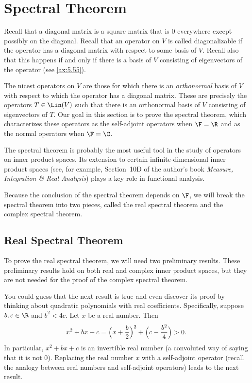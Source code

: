 \DeclareRobustCommand\axeqstep[1]{\refstepcounter{theorem}\label{#1}}
\section{Spectral Theorem}

Recall that a diagonal matrix is a square matrix that is $0$ everywhere except
possibly on the diagonal. Recall that an operator on $V$ is called
diagonalizable if the operator has a diagonal matrix with respect to some basis
of $V$. Recall also that this happens if and only if there is a basis of $V$
consisting of eigenvectors of the operator (see \ref{ax:5.55}).

The nicest operators on $V$ are those for which there is an \emph{orthonormal}
basis of $V$ with respect to which the operator has a diagonal matrix. These are
precisely the operators $T\in\Lin(V)$ such that there is an orthonormal basis of
$V$ consisting of eigenvectors of $T$. Our goal in this section is to prove the
spectral theorem, which characterizes these operators as the self-adjoint
operators when $\F=\R$ and as the normal operators when $\F=\C$.

The spectral theorem is probably the most useful tool in the study of operators
on inner product spaces. Its extension to certain infinite-dimensional inner
product spaces (see, for example, Section~10D of the author's book
\emph{Measure, Integration \& Real Analysis}) plays a key role in functional
analysis.

Because the conclusion of the spectral theorem depends on $\F$, we will break
the spectral theorem into two pieces, called the real spectral theorem and the
complex spectral theorem.

\subsection{Real Spectral Theorem}

To prove the real spectral theorem, we will need two preliminary results. These
preliminary results hold on both real and complex inner product spaces, but
they are not needed for the proof of the complex spectral theorem.

%
You could guess that the next result is true and even discover its proof by
thinking about quadratic polynomials with real coefficients. Specifically,
suppose $b,c\in\R$ and $b^2<4c$. Let $x$ be a real number. Then
\[ x^2+bx+c = \Bigl(x+\frac{b}{2}\Bigr)^2+\Bigl(c-\frac{b^2}{4}\Bigr) > 0. \]
In particular, $x^2+bx+c$ is an invertible real number (a convoluted way of
saying that it is not $0$). Replacing the real number $x$ with a self-adjoint
operator (recall the analogy between real numbers and self-adjoint operators)
leads to the next result.

